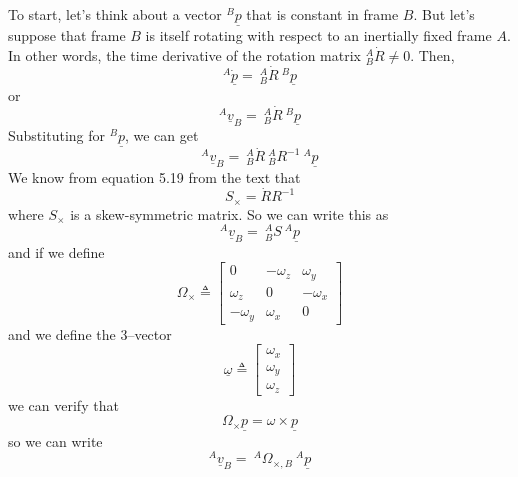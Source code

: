 \documentclass[]{article}
\begin{document}
To start, let's think about a vector $^{B}\underline{p}$ that is constant in frame $B$. But let's suppose that frame $B$ is itself rotating with respect to an inertially fixed frame $A$. In other words, the time derivative of the rotation matrix $^{A}_{B}\dot{R} \ne 0$. Then,
\begin{displaymath}
	^{A}\dot{\underline{p}} = \ ^{A}_{B}\dot{R}\ ^{B}\underline{p}
\end{displaymath}
or
\begin{displaymath}
	^{A}\underline{v}_{B} = \ ^{A}_{B}\dot{R}\ ^{B}\underline{p}
\end{displaymath}
Substituting for $^{B}\underline{p}$, we can get
\begin{displaymath}
^{A}\underline{v}_{B} = \ ^{A}_{B}\dot{R}\ ^{A}_{B}R^{-1}\ ^{A}\underline{p}
\end{displaymath}
We know from equation 5.19 from the text that
\begin{displaymath}
	S_{\times} = \dot{R}R^{-1}
\end{displaymath}
where $S_{\times}$ is a skew-symmetric matrix. So we can write this as
\begin{displaymath}
	^{A}\underline{v}_{B} = \ ^{A}_{B}S\ ^{A}\underline{p}
\end{displaymath}
and if we define
\begin{displaymath}
	\Omega_{\times} \triangleq \left[ 
	\begin{array}{ccc} 0 & -\omega_{z} & \omega_{y} \\ \omega_{z} & 0 & -\omega_{x} \\ -\omega_{y} & \omega_{x} & 0 \end{array}\right]
\end{displaymath}
and we define the 3--vector
\begin{displaymath}
	\underline{\omega} \triangleq \left[ \begin{array}{c} \omega_{x} \\ \omega_{y} \\ \omega_{z} \end{array} \right]
\end{displaymath}
we can verify that
\begin{displaymath}
	\Omega_{\times}\underline{p}= \omega \times \underline{p}
\end{displaymath}
so we can write
\begin{displaymath}
	^{A}\underline{v}_{B} = \ ^{A}\Omega_{\times,B}\ ^{A}\underline{p}
\end{displaymath}
\end{document}
